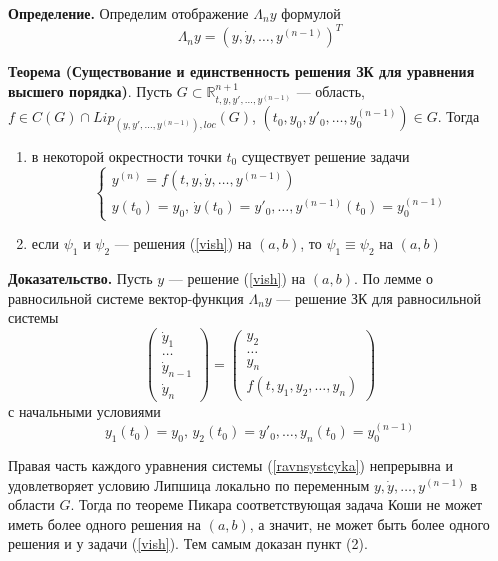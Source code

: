 \textbf{Определение.} Определим отображение $\Lambda_n y$ формулой
\begin{equation*}
    \Lambda_n y = (y, \dot{y},\ldots, y^{(n-1)})^T
\end{equation*}

\noindent \textbf{Теорема (Существование и единственность решения ЗК для уравнения высшего порядка)}. Пусть $G \subset \mathbb{R}_{t, y, y', \ldots, y^{(n-1)}}^{n + 1}$ --- область, $f \in C(G) \cap Lip_{(y,y',\ldots,y^{(n-1)}),loc}(G)$, $(t_0, y_0, y'_0, \ldots, y^{(n-1)}_0) \in G$. Тогда
\begin{enumerate}
    \item в некоторой окрестности точки $t_0$ существует решение задачи
    \begin{equation}
        \begin{cases}
            y^{(n)} = f(t, y, \dot{y}, \ldots, y^{(n-1)})\\
            y(t_0) = y_0,\,\dot{y}(t_0) = y'_0, \ldots, y^{(n-1)}(t_0) = y_0^{(n-1)}
        \end{cases} \label{vish}
    \end{equation}
    \item если $\psi_1$ и $\psi_2$ --- решения (\ref{vish}) на $(a,b)$, то $\psi_1 \equiv \psi_2$ на $(a,b)$
\end{enumerate}
\noindent \textbf{Доказательство.} Пусть $y$ --- решение (\ref{vish}) на $(a,b)$. По лемме о равносильной системе вектор-функция $\Lambda_n y$ --- решение ЗК для равносильной системы
\begin{equation}
    \begin{pmatrix}
    \dot{y}_1\\
    \ldots\\
    \dot{y}_{n-1}\\
    \dot{y}_n
    \end{pmatrix}
    =
    \begin{pmatrix}
    y_2\\
    \ldots\\
    y_n\\
    f(t, y_1, y_2, \ldots, y_n)
    \end{pmatrix}
    \label{ravnsystcyka}
\end{equation}
с начальными условиями
\begin{equation}
    y_1(t_0) = y_0,\, y_2(t_0) = y'_0,\ldots, y_n(t_0) = y_0^{(n-1)} \label{nach}
\end{equation}

Правая часть каждого уравнения системы (\ref{ravnsystcyka}) непрерывна и удовлетворяет условию Липшица локально по переменным $y, \dot{y},\ldots, y^{(n-1)}$ в области $G$. Тогда по теореме Пикара соответствующая задача Коши не может иметь более одного решения на $(a,b)$, а значит, не может быть более одного решения и у задачи (\ref{vish}). Тем самым доказан пункт (2).

